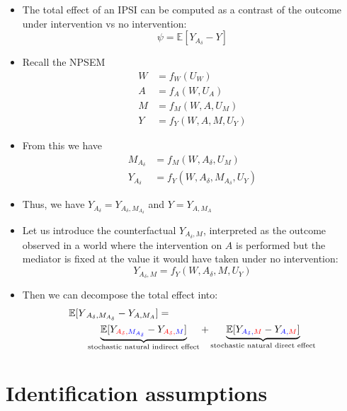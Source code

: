 \documentclass[
  12pt,
]{book}
\theoremstyle{definition}
\theoremstyle{definition}
\theoremstyle{definition}
\newcommand{\E}{\mathbb{E}}
\newcommand{\1}{\mathbbm{1}}
\begin{document}
\begin{itemize}
\item
  The total effect of an IPSI can be computed as a contrast of the outcome under
  intervention vs no intervention:
  \begin{equation*}
    \psi = \E[Y_{A_\delta} - Y]
  \end{equation*}
\item
  Recall the NPSEM
  \begin{align}
    W & = f_W(U_W)\\
    A & = f_A(W, U_A)\\
    M & = f_M(W, A, U_M)\\
    Y & = f_Y(W, A, M, U_Y)
  \end{align}
\item
  From this we have
  \begin{align*}
  M_{A_\delta} & = f_M(W, A_\delta, U_M)\\
  Y_{A_\delta} & = f_Y(W, A_\delta, M_{A_\delta}, U_Y)
  \end{align*}
\item
  Thus, we have \(Y_{A_\delta} = Y_{A_\delta, M_{A_\delta}}\) and \(Y = Y_{A,M_{A}}\)
\item
  Let us introduce the counterfactual \(Y_{A_\delta, M}\), interpreted as the
  outcome observed in a world where the intervention on \(A\) is performed but the
  mediator is fixed at the value it would have taken under no intervention:
  \[Y_{A_\delta, M}  = f_Y(W, A_\delta, M, U_Y)\]
\item
  Then we can decompose the total effect into:
  \begin{align*}
    \E[Y&_{A_\delta,M_{A_\delta}} - Y_{A,M_A}] = \\
    &\underbrace{\E[Y_{\color{red}{A_\delta},\color{blue}{M_{A_\delta}}} -
      Y_{\color{red}{A_\delta},\color{blue}{M}}]}_{\text{stochastic natural indirect effect}} +
      \underbrace{\E[Y_{\color{blue}{A_\delta},\color{red}{M}} -
      Y_{\color{blue}{A},\color{red}{M}}]}_{\text{stochastic natural direct effect}}
  \end{align*}
\end{itemize}

\hypertarget{identification-assumptions-3}{%
\section{Identification assumptions}\label{identification-assumptions-3}}
\end{document}
